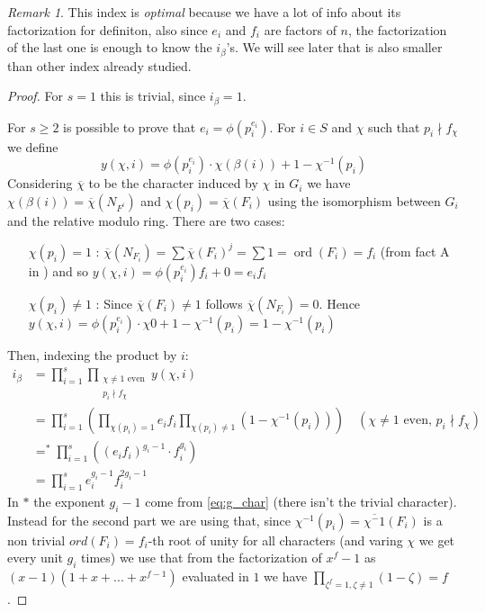 \documentclass[]{article}
\theoremstyle{plain}
\theoremstyle{remark}
\newtheorem{rem}{Remark}
\theoremstyle{definition}
\DeclareMathOperator*{\eqb }{=}
\DeclareMathOperator{\ord}{ord}
\begin{document}
	\begin{rem}
		This index is \textit{optimal} because we have a lot of info about its factorization for definiton, also since $ e_i $ and $ f_i $ are factors of $ n $, the factorization of the last one is enough to know the $ i_\beta $'s. We will see later that is also smaller than other index already studied. 
	\end{rem}
	
	\begin{proof}
		For $ s=1 $ this is trivial, since $ i_\beta = 1 $. 
		
		For $ s \geq 2 $ is possible to prove that $ e_i = \phi ( p_i ^ {e_i}) $. For $ i \in S$ and $ \chi $ such that $ p_i \nmid f_\chi $ we define
		 \[ y(\chi , i) = \phi(p_i^{e_i}) \cdot \chi (\beta (i))  + 1- \chi^{-1} (p_i) \]
		Considering $ \overline{\chi} $ to be the character induced by $ \chi $ in $ G_i$ we have $ \chi(\beta(i)) = \overline{\chi}(N_{F^i})  $ and $ \chi (p_i) = \overline{\chi}(F_i) $ using the isomorphism between $ G_i $ and the relative modulo ring. There are two cases: 
		\begin{itemize}
		\item[$ \chi(p_i) = 1 $ :] $ \overline{\chi}(N_{F_i}) = \sum \overline{\chi}(F_i)^j = \sum 1 = \ord (F_i) = f_i$ (from fact A in \cite[Page~544]{RIN}) and so $ y(\chi , i) = \phi(p_i^{e_i})f_i + 0 = e_i f_i $
		\item[$ \chi(p_i) \neq 1 $ :] Since $ \overline{\chi}({F_i})  \neq 1 $ follows $ \overline{\chi}(N_{F_i}) = 0 $. %
		Hence $ y(\chi , i) = \phi(p_i^{e_i}) \cdot \chi 0  + 1- \chi^{-1} (p_i)= 1- \chi^{-1} (p_i) $
		\end{itemize}
		Then, indexing the product by $ i $:
		\begin{align*}
			i_\beta & = \prod_{i=1}^s	\prod_{ \substack{\chi \neq 1 \text{ even}\\ p_i \nmid f_\chi }} y(\chi ,i)				\\	
			& = \prod_{i=1}^s		\left( \prod_{ \chi(p_i) = 1  } e_i f_i \prod_{\chi(p_i) \neq 1}  (1- \chi^{-1} (p_i))\right) 	\quad (\chi \neq 1 \text{ even, } p_i\nmid f_\chi )		\\	
			& \eqb ^\ast  \prod_{i=1}^s	((e_i f_i )^{g_i - 1} \cdot f_i ^{g_i})				\\	
			 & = \prod_{i=1}^s		e_i^{g_i - 1} f_i ^{2 g_i - 1}		
		\end{align*}
		In $\ast$ the exponent $ g_i - 1 $ come from \ref{eq:g_char} (there isn't the trivial character). Instead for the second part we are using that, since $ \chi^{-1}(p_i) = \overline{\chi^-1}({F_i})  $ is a non trivial $ ord(F_i)=f_i $-th root of unity for all characters (and varing $ \chi $ we get every unit $ g_i $ times) we use that from the factorization of $ x^f - 1  $ as $ (x - 1 )(1 + x + ... + x^{f-1}) $ evaluated in $ 1 $ we have $ \prod_{\zeta^f=1, \zeta\neq 1} (1- \zeta) = f $.
		
		
	\end{proof}
	
	
	\newpage
	\printbibliography
\end{document}
